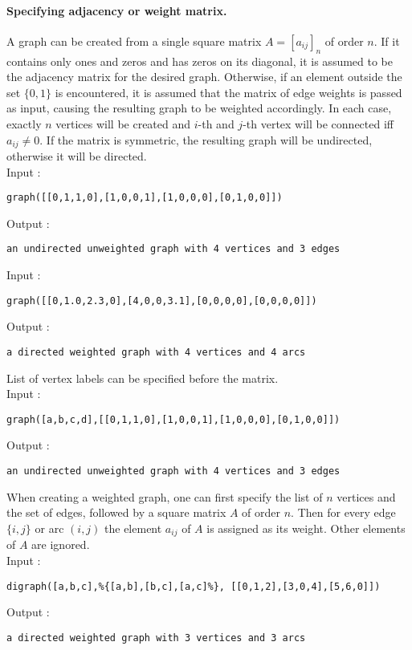 \documentclass[a4paper,11pt]{article}
\begin{document}
\paragraph{Specifying adjacency or weight matrix.}
A graph can be created from a single square matrix $ A=[a_{ij}]_n $ of order $ n $. If it contains only ones and zeros and has zeros on its diagonal, it is assumed to be the adjacency matrix for the desired graph. Otherwise, if an element outside the set $ \{0,1\} $ is encountered, it is assumed that the matrix of edge weights is passed as input, causing the resulting graph to be weighted accordingly. In each case, exactly $ n $ vertices will be created and $ i $-th and $ j $-th vertex will be connected iff $ a_{ij}\neq 0 $. If the matrix is symmetric, the resulting graph will be undirected, otherwise it will be directed.\\
Input :
\begin{center}
  \tt graph([[0,1,1,0],[1,0,0,1],[1,0,0,0],[0,1,0,0]])
\end{center}
Output :
\begin{center}
  \tt an undirected unweighted graph with 4 vertices and 3 edges
\end{center}
Input :
\begin{center}
  \tt graph([[0,1.0,2.3,0],[4,0,0,3.1],[0,0,0,0],[0,0,0,0]])
\end{center}
Output :
\begin{center}
  \tt a directed weighted graph with 4 vertices and 4 arcs
\end{center}
List of vertex labels can be specified before the matrix.\\
Input :
\begin{center}
  \tt graph([a,b,c,d],[[0,1,1,0],[1,0,0,1],[1,0,0,0],[0,1,0,0]])
\end{center}
Output :
\begin{center}
  \tt an undirected unweighted graph with 4 vertices and 3 edges
\end{center}
When creating a weighted graph, one can first specify the list of $ n $ vertices and the set of edges, followed by a square matrix $ A $ of order $ n $. Then for every edge $ \{i,j\} $ or arc $ (i,j) $ the element $ a_{ij} $ of $ A $ is assigned as its weight. Other elements of $ A $ are ignored.\\
Input :
\begin{center}
  \tt digraph([a,b,c],\%\{[a,b],[b,c],[a,c]\%\}, [[0,1,2],[3,0,4],[5,6,0]])
\end{center}
Output :
\begin{center}
  \tt a directed weighted graph with 3 vertices and 3 arcs
\end{center}
\end{document}
